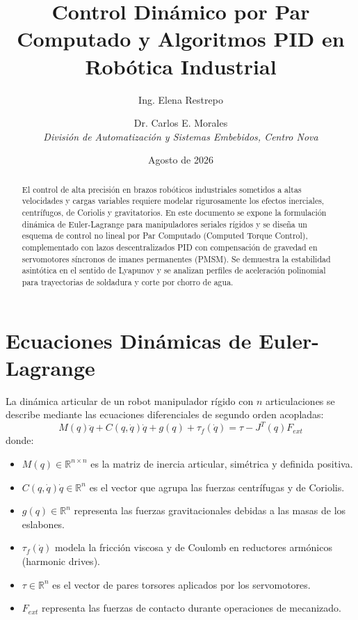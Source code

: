 \documentclass[11pt,a4paper]{article}
\title{Control Dinámico por Par Computado y Algoritmos PID en Robótica Industrial}
\author{Ing. Elena Restrepo \and Dr. Carlos E. Morales \\
\textit{División de Automatización y Sistemas Embebidos, Centro Nova}}
\date{Agosto de 2026}
\begin{document}
\maketitle

\begin{abstract}
El control de alta precisión en brazos robóticos industriales sometidos a altas velocidades y cargas variables requiere modelar rigurosamente los efectos inerciales, centrífugos, de Coriolis y gravitatorios. En este documento se expone la formulación dinámica de Euler-Lagrange para manipuladores seriales rígidos y se diseña un esquema de control no lineal por Par Computado (Computed Torque Control), complementado con lazos descentralizados PID con compensación de gravedad en servomotores síncronos de imanes permanentes (PMSM). Se demuestra la estabilidad asintótica en el sentido de Lyapunov y se analizan perfiles de aceleración polinomial para trayectorias de soldadura y corte por chorro de agua.
\end{abstract}

\section{Ecuaciones Dinámicas de Euler-Lagrange}
La dinámica articular de un robot manipulador rígido con $n$ articulaciones se describe mediante las ecuaciones diferenciales de segundo orden acopladas:
\begin{equation}
M(q)\ddot{q} + C(q,\dot{q})\dot{q} + g(q) + \tau_f(\dot{q}) = \tau - J^T(q) F_{ext}
\end{equation}
donde:
\begin{itemize}
    \item $M(q) \in \mathbb{R}^{n \times n}$ es la matriz de inercia articular, simétrica y definida positiva.
    \item $C(q,\dot{q})\dot{q} \in \mathbb{R}^n$ es el vector que agrupa las fuerzas centrífugas y de Coriolis.
    \item $g(q) \in \mathbb{R}^n$ representa las fuerzas gravitacionales debidas a las masas de los eslabones.
    \item $\tau_f(\dot{q})$ modela la fricción viscosa y de Coulomb en reductores armónicos (harmonic drives).
    \item $\tau \in \mathbb{R}^n$ es el vector de pares torsores aplicados por los servomotores.
    \item $F_{ext}$ representa las fuerzas de contacto durante operaciones de mecanizado.
\end{itemize}
\end{document}
